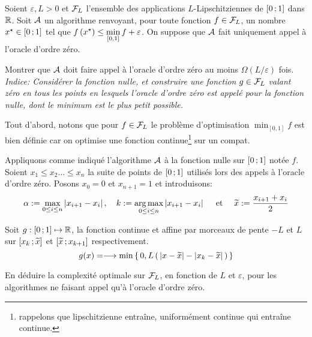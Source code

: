 \begin{exo}
Soient $\varepsilon, L>0$ et $\mathcal { F } _ { L }$ l'ensemble des applications $L$-Lipschitziennes de $\mathopen{[}0\mathpunct{};1\mathclose{]}$
 dans $\mathbb{R}$. Soit $\mathcal{A}$ un algorithme renvoyant, pour toute fonction $ f \in \mathcal { F } _ { L }$,
  un nombre $\xopt \in \intff{0}{1}$ tel que $\displaystyle f \left( \xopt \right) \leq \min _ { [ 0,1 ] } f + \varepsilon$. On suppose que $\mathcal{A}$ fait uniquement appel à l’oracle d’ordre zéro.
\end{exo}

\begin{qst}
Montrer que $\mathcal{A}$ doit faire appel à l’oracle d’ordre zéro au moins $\Omega ( L / \varepsilon )$ fois. \textit{Indice: Considérer la fonction nulle, et construire une fonction $g \in \mathcal { F } _ { L }$ valant zéro en tous les points en lesquels l’oracle d’ordre zéro est appelé pour la fonction nulle, dont le minimum est le plus petit possible.}
\end{qst}

\begin{rep}

Tout d'abord, notons que pour $ f \in \mathcal { F } _ { L }$ le problème d'optimisation $ \displaystyle \min _ { [ 0,1 ] } f$ est bien définie car on optimise une fonction continue\footnote{rappelons que lipschitzienne entraîne, uniformément continue qui entraîne continue.} sur un compat.

Appliquons comme indiqué l'algorithme $\mathcal{A}$ à la fonction nulle sur $\mathopen{[}0\mathpunct{};1\mathclose{]}$ notée $f$. Soient $x_1 \leq x_2 \ldots \leq x_n$ la suite de points de $\mathopen{[}0\mathpunct{};1\mathclose{]}$ utilisés lors des appels à l'oracle d'ordre zéro. Posons $x_0 = 0$ et $x_{n+1}=1$ et introduisons:
  $$\alpha := \max_{0\leq i \leq n} \abs{x_{i+1}-x_{i}}
  , \quad  k := \argmax_{0\leq i \leq n} \abs{x_{i+1}-x_{i}}
  \quad \text{ et } \quad \xtilde := \frac{x_{i+1}+x_{i}}{2}
  $$

  Soit $g:\mathopen{[}0\mathpunct{};1\mathclose{]} \mapsto \mathbb{R}$, la fonction continue et affine par morceaux de pente
  $-L$ et $L$ sur $\mathopen{[}x_k\mathpunct{};\widetilde{x}\mathclose{]}$ et $\mathopen{[}\widetilde{x}\mathpunct{};x_{k+1}\mathclose{]}$ respectivement.
  $$g(x)= \longrightarrow \min \acc{ 0,L\prt{\abs{x-\xtilde} - \abs{x_k-\xtilde}} }$$
\end{rep}


\begin{qst}
En déduire la complexité optimale sur $\mathcal { F } _ { L }$, en fonction de $L$ et $\varepsilon$, pour les algorithmes ne faisant appel qu’à l’oracle d’ordre zéro.
\end{qst}

\begin{rep}

\end{rep}
